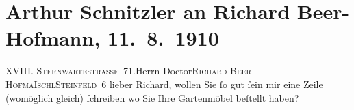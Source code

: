 

         
         \renewcommand{\erwaehntePersonen}{Personen: Richard Beer-Hofmann}
         \renewcommand{\erwaehnteOrte}{Orte: Bad Ischl, Steinfeld, Sternwartestraße 71, Wien, XVIII., Währing}
         \renewcommand{\erwaehnteWerke}{}
               \section[Arthur Schnitzler an Richard Beer-Hofmann, 11. 8. 1910]{ Arthur Schnitzler an Richard Beer-Hofmann, 11. 8. 1910}\nopagebreak{}\rehead{ }\begin{ledgroupsized}[t]{13cm}\normalsize\beginnumbering{} \toendnotes[C]{\smallbreak\pagebreak[2]} 
\toendnotes[C]{\smallbreak}\pstart{}{\pb}\textsc{XVIII. Sternwartestraße 71.}\pend{}{\bigskip}\pstart{}Herrn Doctor\pend{}\pstart{}\textsc{Richard Beer-Hofma{\geminationn}}\pend{}\pstart{}\textsc{Ischl}\pend{}\pstart{}\textsc{Steinfeld 6}\pend{}{\bigskip}\pstart
           \noindent{}{\pb}lieber Richard, wollen Sie ſo gut ſein mir eine Zeile (womöglich
               gleich) ſchreiben wo Sie Ihre Gartenmöbel beſtellt haben?\pend
           \pstart \label{T_L01953-1v}\label{T_L01953-1h}\pend{}
         
         \endnumbering{}\end{ledgroupsized}  \newcommand{\dateiname}{L01953}\newcommand{\titel}{Arthur Schnitzler an Richard Beer-Hofmann, 11. 8. 1910}\newcommand{\editorInnen}{Martin Anton Müller und Gerd-Hermann Susen}
      